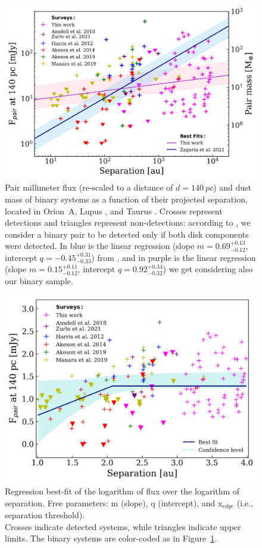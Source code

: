 \documentclass{aa}
\begin{document}
\begin{figure}
    \centering
    \includegraphics[width=15cm]{Flux_Separation_Mass1.png}
    \caption{Pair millimeter flux (re-scaled to a distance of $d=140~pc$) and dust mass of binary systems as a function of their projected separation, located in Orion~A, Lupus \citep{Zurlo21, Ansdell18}, and Taurus \citep{Akeson19, Manara19, Akeson14, Harris_2012}. Crosses represent detections and triangles represent non-detections: according to \cite{Akeson19}, we consider a binary pair to be detected only if both disk components were detected. In blue is the linear regression (slope $m=0.69^{+0.13}_{-0.12}$, intercept $q=-0.45^{+0.31}_{-0.33}$) from \cite{Zagaria21}, and in purple is the linear regression (slope $m=0.15^{+0.11}_{-0.12}$, intercept $q=0.92^{+0.34}_{-0.32}$) we get considering also our binary sample.}
    \label{figure:fluxsep}
\end{figure}


\begin{figure}
    \centering
    \includegraphics[width=15cm]{Bestfit_linearconst_up.png}
    \caption{Regression best-fit of the logarithm of flux over the logarithm of separation. Free parameters: m (slope),  q (intercept), and x$_{edge}$ (i.e., separation threshold).\\ Crosses indicate detected systems, while triangles indicate upper limits. The binary systems are color-coded as in Figure~\ref{figure:fluxsep}.}
    \label{figure:linearconst}
\end{figure}
\end{document}
